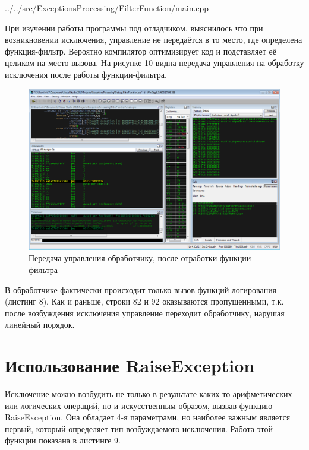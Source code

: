 \documentclass[a4paper, 12pt]{report}		%
\begin{document}

{../../src/ExceptionsProcessing/FilterFunction/main.cpp}

При изучении работы программы под отладчиком, выяснилось что при возникновении исключения, управление не передаётся в то место, где определена функция-фильтр. Вероятно компилятор оптимизирует код и подставляет её целиком на место вызова. На рисунке 10 видна передача управления на обработку исключения после работы функции-фильтра.

\begin{figure}[h!]
\centering
\includegraphics[scale=0.5]{res/003}
\caption{Передача управления обработчику, после отработки функции-фильтра}
\end{figure}

В обработчике фактически происходит только вызов функций логирования (листинг 8). Как и раньше, строки 82 и 92 оказываются пропущенными, т.к. после возбуждения исключения управление переходит обработчику, нарушая линейный порядок.




\chapter*{Использование RaiseException}

Исключение можно возбудить не только в результате каких-то арифметических или логических операций, но и искусственным образом, вызвав функцию RaiseException. Она обладает 4-я параметрами, но наиболее важным является первый, который определяет тип возбуждаемого исключения\cite{Dushutina}. Работа этой функции показана в листинге 9.
\end{document}
